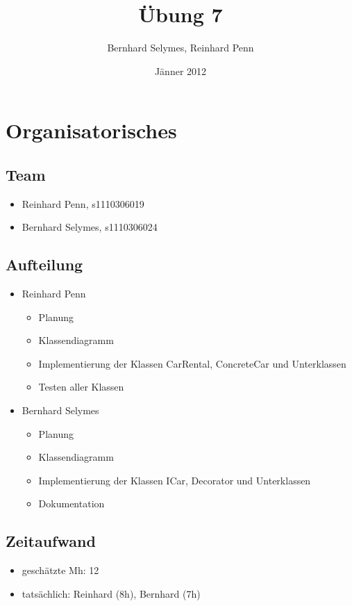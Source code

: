 \documentclass[12pt,a4paper]{article}
\begin{document}
\title{Übung 7}
\author{Bernhard Selymes, Reinhard Penn}
\date{Jänner 2012}

\normalsize

\newcommand{\CodePath}{../CarRental/CarRental/}

\section{Organisatorisches}

\subsection{Team}
	\begin {itemize} 
		\item Reinhard Penn, s1110306019 
		\item Bernhard Selymes, s1110306024
	\end {itemize}

\subsection{Aufteilung}
	\begin {itemize} 
		\item Reinhard Penn
			\begin {itemize}
				\item Planung
				\item Klassendiagramm
				\item Implementierung der Klassen CarRental, ConcreteCar und Unterklassen
				\item Testen aller Klassen
			\end {itemize}
		\item Bernhard Selymes
			\begin {itemize}
				\item Planung
				\item Klassendiagramm
				\item Implementierung der Klassen ICar, Decorator und Unterklassen
				\item Dokumentation		
			\end {itemize}
	\end {itemize}


\subsection{Zeitaufwand}
	\begin {itemize}
		\item geschätzte Mh: 12
		\item tatsächlich: Reinhard (8h), Bernhard  (7h)
	\end {itemize}
\end{document}
